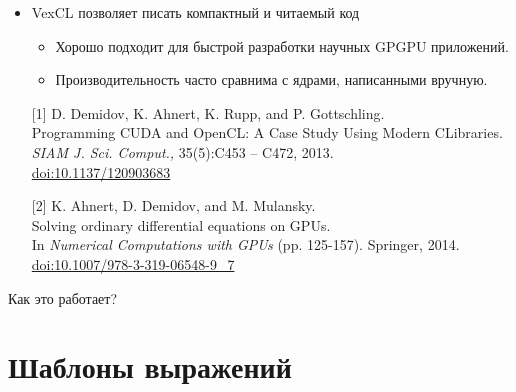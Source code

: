 \documentclass[@BEAMER_OPTIONS@]{beamer}
\newcommand{\CXX}{{\rm C}\plusplus}
\begin{document}
\begin{frame}[fragile]{}
    \begin{itemize}
        \item VexCL позволяет писать компактный и читаемый код
            \begin{itemize}
                \item Хорошо подходит для быстрой разработки научных GPGPU
                    приложений.
                \item Производительность часто сравнима с ядрами, написанными
                    вручную.
            \end{itemize}
    \end{itemize}
    \vspace{\baselineskip}
    \begin{itemize}
        \item[{[1]}] D. Demidov, K. Ahnert, K. Rupp, and P. Gottschling.\\
            Programming CUDA and OpenCL: A Case Study Using Modern \CXX Libraries.\\
            \emph{SIAM J. Sci. Comput.,} 35(5):C453 – C472, 2013.\\
            \href{http://dx.doi.org/10.1137/120903683}{doi:10.1137/120903683}
        \item[{[2]}] K. Ahnert, D. Demidov, and M. Mulansky.\\
            Solving ordinary differential equations on GPUs.\\
            In \emph{Numerical Computations with GPUs} (pp. 125-157).  Springer, 2014.
            \href{http://dx.doi.org/10.1007/978-3-319-06548-9\_7}{doi:10.1007/978-3-319-06548-9\_7}
    \end{itemize}
\end{frame}

\begin{frame}
    \begin{center}
        \huge{Как это работает?}
    \end{center}
\end{frame}

\section{Шаблоны выражений}
\begin{frame}
    \sectionpage
\end{frame}
\end{document}

